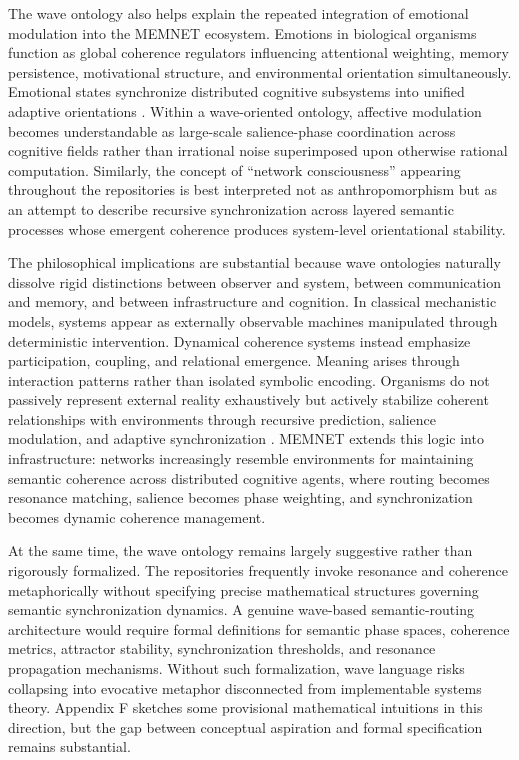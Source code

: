 \documentclass[11pt,a4paper]{article}
\begin{document}
The wave ontology also helps explain the repeated integration of emotional modulation into the MEMNET ecosystem. Emotions in biological organisms function as global coherence regulators influencing attentional weighting, memory persistence, motivational structure, and environmental orientation simultaneously. Emotional states synchronize distributed cognitive subsystems into unified adaptive orientations \cite{friston2010}. Within a wave-oriented ontology, affective modulation becomes understandable as large-scale salience-phase coordination across cognitive fields rather than irrational noise superimposed upon otherwise rational computation. Similarly, the concept of ``network consciousness'' appearing throughout the repositories is best interpreted not as anthropomorphism but as an attempt to describe recursive synchronization across layered semantic processes whose emergent coherence produces system-level orientational stability.

The philosophical implications are substantial because wave ontologies naturally dissolve rigid distinctions between observer and system, between communication and memory, and between infrastructure and cognition. In classical mechanistic models, systems appear as externally observable machines manipulated through deterministic intervention. Dynamical coherence systems instead emphasize participation, coupling, and relational emergence. Meaning arises through interaction patterns rather than isolated symbolic encoding. Organisms do not passively represent external reality exhaustively but actively stabilize coherent relationships with environments through recursive prediction, salience modulation, and adaptive synchronization \cite{friston2010}. MEMNET extends this logic into infrastructure: networks increasingly resemble environments for maintaining semantic coherence across distributed cognitive agents, where routing becomes resonance matching, salience becomes phase weighting, and synchronization becomes dynamic coherence management.

At the same time, the wave ontology remains largely suggestive rather than rigorously formalized. The repositories frequently invoke resonance and coherence metaphorically without specifying precise mathematical structures governing semantic synchronization dynamics. A genuine wave-based semantic-routing architecture would require formal definitions for semantic phase spaces, coherence metrics, attractor stability, synchronization thresholds, and resonance propagation mechanisms. Without such formalization, wave language risks collapsing into evocative metaphor disconnected from implementable systems theory. Appendix F sketches some provisional mathematical intuitions in this direction, but the gap between conceptual aspiration and formal specification remains substantial.
\end{document}

